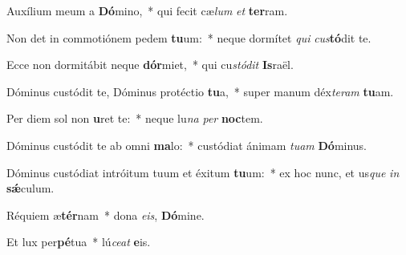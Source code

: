 \item Auxílium meum a \textbf{Dó}mino,~* qui fecit cæ\textit{lum} \textit{et} \textbf{ter}ram.
\item Non det in commotiónem pedem \textbf{tu}um:~* neque dormítet \textit{qui} \textit{cus}\textbf{tó}dit te.
\item Ecce non dormitábit neque \textbf{dór}miet,~* qui cu\textit{stódit} \textbf{Is}raël.
\item Dóminus custódit te, Dóminus protéctio \textbf{tu}a,~* super manum déx\textit{teram} \textbf{tu}am.
\item Per diem sol non \textbf{u}ret te:~* neque lu\textit{na} \textit{per} \textbf{noc}tem.
\item Dóminus custódit te ab omni \textbf{ma}lo:~* custódiat ánimam \textit{tuam} \textbf{Dó}minus.
\item Dóminus custódiat intróitum tuum et éxitum \textbf{tu}um:~* ex hoc nunc, et us\hspace*{0.03em}\textit{que} \textit{in} \textbf{sǽ}culum.
\item Réquiem æ\textbf{tér}nam~* dona \textit{eis}, \textbf{Dó}mine.
\item Et lux per\textbf{pé}tua~* lú\textit{ceat} \textbf{e}is.